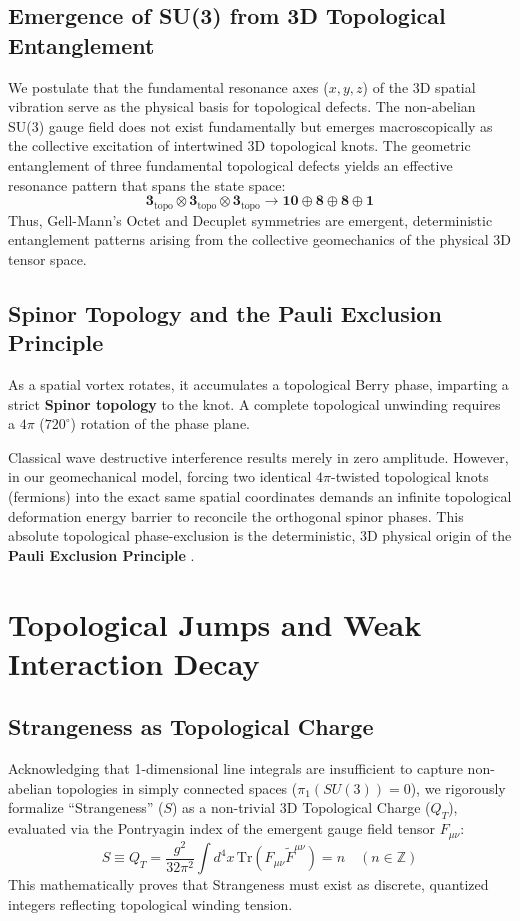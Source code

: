 \documentclass[reprint,amsmath,amssymb,aps,prd]{revtex4-2}
\begin{document}
\subsection{Emergence of SU(3) from 3D Topological Entanglement}
We postulate that the fundamental resonance axes ($x, y, z$) of the 3D spatial vibration serve as the physical basis for topological defects. The non-abelian SU(3) gauge field does not exist fundamentally but emerges macroscopically as the collective excitation of intertwined 3D topological knots. The geometric entanglement of three fundamental topological defects yields an effective resonance pattern that spans the state space:
\begin{equation}
\mathbf{3}_{\mathrm{topo}} \otimes \mathbf{3}_{\mathrm{topo}} \otimes \mathbf{3}_{\mathrm{topo}} \to \mathbf{10} \oplus \mathbf{8} \oplus \mathbf{8} \oplus \mathbf{1}
\end{equation}
Thus, Gell-Mann's Octet and Decuplet symmetries \cite{GellMann1964} are emergent, deterministic entanglement patterns arising from the collective geomechanics of the physical 3D tensor space.

\subsection{Spinor Topology and the Pauli Exclusion Principle}
As a spatial vortex rotates, it accumulates a topological Berry phase, imparting a strict \textbf{Spinor topology} to the knot. A complete topological unwinding requires a $4\pi$ ($720^\circ$) rotation of the phase plane. 

Classical wave destructive interference results merely in zero amplitude. However, in our geomechanical model, forcing two identical $4\pi$-twisted topological knots (fermions) into the exact same spatial coordinates demands an infinite topological deformation energy barrier to reconcile the orthogonal spinor phases. This absolute topological phase-exclusion is the deterministic, 3D physical origin of the \textbf{Pauli Exclusion Principle} \cite{Pauli1925}.

\section{Topological Jumps and Weak Interaction Decay}

\subsection{Strangeness as Topological Charge}
Acknowledging that 1-dimensional line integrals are insufficient to capture non-abelian topologies in simply connected spaces ($\pi_1(SU(3)) = 0$), we rigorously formalize ``Strangeness'' ($S$) as a non-trivial 3D Topological Charge ($Q_T$), evaluated via the Pontryagin index of the emergent gauge field tensor $F_{\mu\nu}$:
\begin{equation}
S \equiv Q_T = \frac{g^2}{32\pi^2} \int d^4x \, \mathrm{Tr}(F_{\mu\nu} \tilde{F}^{\mu\nu}) = n \quad (n \in \mathbb{Z})
\end{equation}
This mathematically proves that Strangeness must exist as discrete, quantized integers reflecting topological winding tension.
\end{document}
